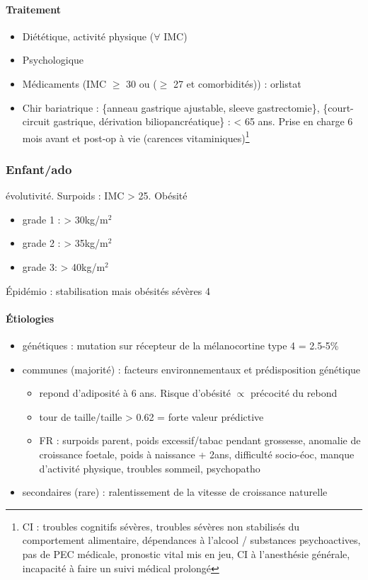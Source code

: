 \documentclass[11pt]{article}
\begin{document}
\paragraph{Traitement}
\label{sec:orgc9a70b2}
\begin{itemize}
\item Diététique, activité physique (\(\forall\) IMC)
\item Psychologique
\item Médicaments (IMC \(\ge\) 30 ou (\(\ge\) 27 et comorbidités)) : orlistat
\item Chir bariatrique :  \{anneau gastrique ajustable, sleeve gastrectomie\},
\{court-circuit gastrique, dérivation biliopancréatique\} : < 65 ans. Prise en
charge 6 mois avant et post-op à vie (carences vitaminiques)\footnote{CI : troubles cognitifs sévères, troubles sévères non stabilisés du
comportement alimentaire, dépendances à l'alcool / substances psychoactives, pas
de PEC médicale, pronostic vital mis en jeu, CI à l'anesthésie générale,
incapacité à faire un suivi médical prolongé}
\end{itemize}
\subsubsection{Enfant/ado}
\label{sec:orgd670268}
\danger{} évolutivité. Surpoids : IMC > 25. Obésité 
\begin{itemize}
\item grade 1 : > 30kg/m\(^{\text{2}}\)
\item grade 2 : > 35kg/m\(^{\text{2}}\)
\item grade 3: > 40kg/m\(^{\text{2}}\)
\end{itemize}

Épidémio : stabilisation mais obésités sévères \texttimes{}4

\paragraph{Étiologies}
\label{sec:orgfc1e910}
\begin{itemize}
\item génétiques : mutation sur récepteur de la mélanocortine type 4 = 2.5-5\%
\item communes (majorité) : facteurs environnementaux et prédisposition génétique
\begin{itemize}
\item repond d'adiposité à 6 ans. Risque d'obésité \(\propto\) précocité du rebond
\item tour de taille/taille > 0.62 = forte valeur prédictive
\item FR : surpoids parent, poids excessif/tabac pendant grossesse, anomalie de
croissance foetale, \inc\inc poids à naissance + 2ans, difficulté
socio-éoc, manque d'activité physique, troubles sommeil, psychopatho
\end{itemize}
\item secondaires (rare) : ralentissement de la vitesse de croissance naturelle
\end{itemize}
\end{document}
